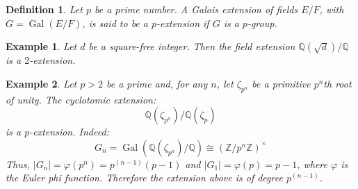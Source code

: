 \documentclass[12pt]{article}
\newtheorem{defn}{Definition}
\newtheorem{exa}{Example}
\newcommand{\Ints}{\mathbb{Z}}
\newcommand{\Rats}{\mathbb{Q}}
\begin{document}
\begin{defn}
Let $p$ be a prime number. A Galois extension of fields $E/F$, with $G=\operatorname{Gal}(E/F)$, is said to be a $p$-extension if $G$ is a $p$-group.  
\end{defn}

\begin{exa}
Let $d$ be a square-free integer. Then the field extension $\Rats(\sqrt{d})/\Rats$ is a $2$-extension.
\end{exa}

\begin{exa}
Let $p>2$ be a prime and, for any $n$, let $\zeta_{p^n}$ be a primitive $p^n$th root of unity. The cyclotomic extension:
$$\Rats(\zeta_{p^n})/\Rats(\zeta_p)$$
is a $p$-extension. Indeed:
$$G_n=\operatorname{Gal}(\Rats(\zeta_{p^n})/\Rats)\cong (\Ints/p^n\Ints)^\times$$
Thus, $|G_n|=\varphi(p^n)=p^{(n-1)}(p-1)$ and $|G_1|=\varphi(p)=p-1$, where $\varphi$ is the Euler phi function. Therefore the extension above is of degree $p^{(n-1)}$.
\end{exa}
\end{document}
